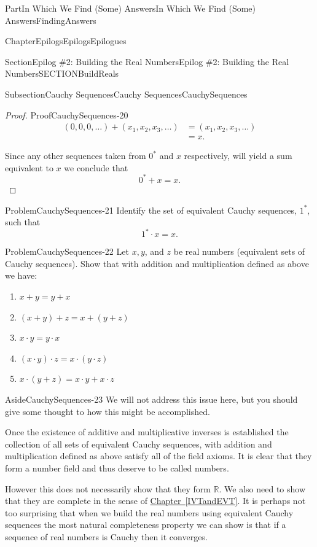 \documentclass[oneside,10pt,]{book}
\newcommand{\xreffont}{\relax}
\numberwithin{equation}{part}
\newcommand{\RR}{\mathbb {R}}
\newcommand{\amp}{&}
\begin{document}
\begin{partptx}{Part}{In Which We Find (Some) Answers}{}{In Which We Find (Some) Answers}{}{}{FindingAnswers}
\begin{chapterptx}{Chapter}{Epilogs}{}{Epilogs}{}{}{Epilogues}
\begin{sectionptx}{Section}{Epilog \#2: Building the Real Numbers}{}{Epilog \#2: Building the Real Numbers}{}{}{SECTIONBuildReals}
\begin{subsectionptx}{Subsection}{Cauchy Sequences}{}{Cauchy Sequences}{}{}{CauchySequences}
\begin{proof}{Proof}{}{CauchySequences-20}
\begin{align*}
(0, 0, 0, \ldots) + (x_1, x_2, x_3, \ldots) \amp = (x_1, x_2, x_3, \ldots)\\
\amp = x\text{.}
\end{align*}
%
\par
Since any other sequences taken from \(0^*\) and \(x\) respectively, will yield a sum equivalent to \(x\)   we conclude that%
\begin{equation*}
0^*+x=x\text{.}
\end{equation*}
%
\end{proof}
\begin{problem}{Problem}{}{CauchySequences-21}%
Identify the set of equivalent Cauchy sequences, \(1^*\), such that%
\begin{equation*}
1^*\cdot x=x\text{.}
\end{equation*}
%
\end{problem}
\begin{problem}{Problem}{}{CauchySequences-22}%
Let \(x, y\), and \(z\) be real numbers (equivalent sets of Cauchy sequences). Show that with addition and multiplication defined as above we have:%
\begin{enumerate}[font=\bfseries,label=(\alph*),ref=\alph*]%
\item{}\(x+y=y+x\)%
\item{}\((x+y)+z=x+(y+z)\)%
\item{}\(x\cdot y=y\cdot x\)%
\item{}\((x\cdot y)\cdot z=x\cdot (y\cdot z)\)%
\item{}\(x\cdot(y+z)=x\cdot y+x\cdot z\)%
\end{enumerate}%
\end{problem}
\begin{aside}{Aside}{}{CauchySequences-23}%
We will not address this issue here, but you should give some thought to how this might be accomplished.%
\end{aside}
Once the existence of additive and multiplicative inverses is established the collection of all sets of equivalent Cauchy sequences, with addition and multiplication defined as above satisfy all of the field axioms.  It is clear that they form a number field and thus deserve to be called numbers.%
\par
However this does not necessarily show that they form \(\RR\).  We also need to show that they are complete in the sense of \hyperref[IVTandEVT]{Chapter~{\xreffont\ref{IVTandEVT}}}.  It is perhaps not too surprising that when we build the real numbers using equivalent Cauchy sequences the most natural completeness property we can show is that if a sequence of real numbers is Cauchy then it converges.%

\end{subsectionptx}
\end{sectionptx}
\end{chapterptx}
\end{partptx}
\end{document}
